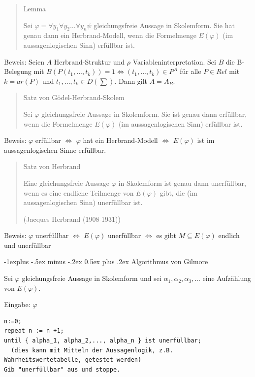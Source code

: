 \documentclass[a4paper]{article}
\makeatletter
\renewcommand{\subsection}{\@startsection{subsection}{2}{0mm}%
                {-1explus -.5ex minus -.2ex}%
                {0.5ex plus .2ex}%
                {\normalfont\normalsize\bfseries}}
\makeatother
\begin{document}
\begin{multicols}{3}
  \begin{quote}
    Lemma

    Sei $\varphi=\forall y_1 \forall y_2 ...\forall y_n\psi$ gleichungsfreie
    Aussage in Skolemform. Sie hat genau dann ein Herbrand-Modell, wenn die
    Formelmenge $E(\varphi)$ (im aussagenlogischen Sinn) erfüllbar ist.
  \end{quote}

  Beweis: Seien $A$ Herbrand-Struktur und $\rho$ Variableninterpretation.
  Sei $B$ die B-Belegung mit
  $B(P(t_1,...,t_k))= 1\Leftrightarrow(t_1,...,t_k)\in P^A$ für alle
  $P\in Rel$ mit $k=ar(P)$ und $t_1,...,t_k\in D(\sum)$. Dann gilt
  $A=A_B$.

  \begin{quote}
    Satz von Gödel-Herbrand-Skolem

    Sei $\varphi$ gleichungsfreie Aussage in Skolemform. Sie ist genau dann
    erfüllbar, wenn die Formelmenge $E(\varphi)$ (im aussagenlogischen Sinn)
    erfüllbar ist.
  \end{quote}

  Beweis: $\varphi$ erfüllbar $\Leftrightarrow$ $\varphi$ hat ein
  Herbrand-Modell $\Leftrightarrow$ $E(\varphi)$ ist im aussagenlogischen
  Sinne erfüllbar.

  \begin{quote}
    Satz von Herbrand

    Eine gleichungsfreie Aussage $\varphi$ in Skolemform ist genau dann
    unerfüllbar, wenn es eine endliche Teilmenge von $E(\varphi)$ gibt, die
    (im aussagenlogischen Sinn) unerfüllbar ist.

    (Jacques Herbrand (1908-1931))
  \end{quote}

  Beweis: $\varphi$ unerfüllbar $\Leftrightarrow$ $E(\varphi)$ unerfüllbar
  $\Leftrightarrow$ es gibt $M\subseteq E(\varphi)$ endlich und
  unerfüllbar

  \subsection{Algorithmus von Gilmore}\label{algorithmus-von-gilmore}

  Sei $\varphi$ gleichungsfreie Aussage in Skolemform und sei
  $\alpha_1,\alpha_2,\alpha_3,...$ eine Aufzählung von $E(\varphi)$.

  Eingabe: $\varphi$

  \begin{verbatim}
n:=0;
repeat n := n +1;
until { alpha_1, alpha_2,..., alpha_n } ist unerfüllbar;
  (dies kann mit Mitteln der Aussagenlogik, z.B. Wahrheitswertetabelle, getestet werden)
Gib "unerfüllbar" aus und stoppe.
\end{verbatim}


\end{multicols}
\end{document}
